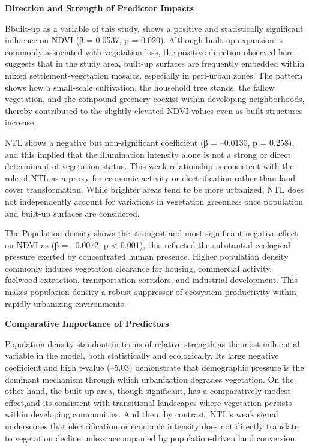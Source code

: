\textbf{Direction and Strength of Predictor Impacts}

Bbuilt-up as a variable of this study, shows a positive and statistically significant influence on NDVI (β = 0.0537, p = 0.020). Although built-up expansion is commonly associated with vegetation loss, the positive direction observed here suggests that in the study area, built-up surfaces are frequently embedded within mixed settlement-vegetation mosaics, especially in peri-urban zones. The pattern shows how a small-scale cultivation, the household tree stands, the fallow vegetation, and the compound greenery coexist within developing neighborhoods, thereby contributed to the slightly elevated NDVI values even as built structures increase.

NTL shows a negative but non-significant coefficient (β = --0.0130, p = 0.258), and this implied that the illumination intensity alone is not a strong or direct determinant of vegetation status. This weak relationship is consistent with the role of NTL as a proxy for economic activity or electrification rather than land cover transformation. While brighter areas tend to be more urbanized, NTL does not independently account for variations in vegetation greenness once population and built-up surfaces are considered.

The Population density shows the strongest and most significant negative effect on NDVI as (β = --0.0072, p \textless{} 0.001), this reflected the substantial ecological pressure exerted by concentrated human presence. Higher population density commonly induces vegetation clearance for housing, commercial activity, fuelwood extraction, transportation corridors, and industrial development. This makes population density a robust suppressor of ecosystem productivity within rapidly urbanizing environments.

\textbf{Comparative Importance of Predictors}

Population density standout in terms of relative strength as the most influential variable in the model, both statistically and ecologically. Its large negative coefficient and high t-value (--5.03) demonstrate that demographic pressure is the dominant mechanism through which urbanization degrades vegetation. On the other hand, the built-up area, though significant, has a comparatively modest effect,and its consistent with transitional landscapes where vegetation persists within developing communities. And then, by contrast, NTL's weak signal underscores that electrification or economic intensity does not directly translate to vegetation decline unless accompanied by population-driven land conversion.

